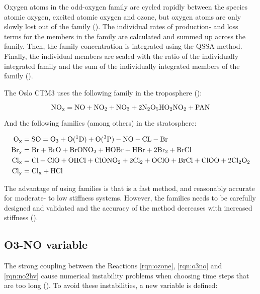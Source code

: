 Oxygen atoms in the odd-oxygen family are cycled rapidly between the species atomic oxygen, excited atomic oxygen and ozone, but oxygen atoms are only slowly lost out of the family (\cite{AtmModFund}). The individual rates of production- and loss terms for the members in the family are calculated and summed up across the family. Then, the family concentration is integrated using the QSSA method. Finally, the individual members are scaled with the ratio of the individually integrated family and the sum of the individually integrated members of the family (\cite{SovdeManual}).

\medskip

The Oslo CTM3 uses the following family in the troposphere (\cite{SovdeManual}): 

\begin{equation*}
    \mathrm{NO_x} = \mathrm{NO} + \mathrm{NO_2} + \mathrm{NO_3} + 2\mathrm{N_2O_5} \mathrm{HO_2NO_2} + \mathrm{PAN}    
\end{equation*}

And the following families (among others) in the stratosphere:

\begin{align*}
    \mathrm{O_x} & = \mathrm{SO} = \mathrm{O_3} + \mathrm{O(^1D)} + \mathrm{O(^3P)} - \mathrm{NO} - \mathrm{CL} - \mathrm{Br} \\
    \mathrm{Br_y} & = \mathrm{Br} + \mathrm{BrO} + \mathrm{BrONO_2} + \mathrm{HOBr} + \mathrm{HBr} + 2\mathrm{Br_2} + \mathrm{BrCl} \\
    \mathrm{Cl_x} & = \mathrm{Cl} + \mathrm{ClO} + \mathrm{OHCl} + \mathrm{ClONO_2} + 2\mathrm{Cl_2} + \mathrm{OClO} + \mathrm{BrCl} + \mathrm{ClOO} + 2\mathrm{Cl_2O_2} \\
    \mathrm{Cl_y} & = \mathrm{Cl_x} + \mathrm{HCl}
\end{align*}

The advantage of using families is that is a fast method, and reasonably accurate for moderate- to low stiffness systems. However, the families needs to be carefully designed and validated and the accuracy of the method decreases with increased stiffness (\cite{AtmModFund}).


\subsection{O3-NO variable}\label{sec:O3-NO}

The strong coupling between the Reactions \ref{rqn:ozone}, \ref{rqn:o3no} and \ref{rqn:no2hv} cause numerical instability problems when choosing time steps that are too long (\cite{Hesstvedt1978}). To avoid these instabilities, a new variable is defined: 

